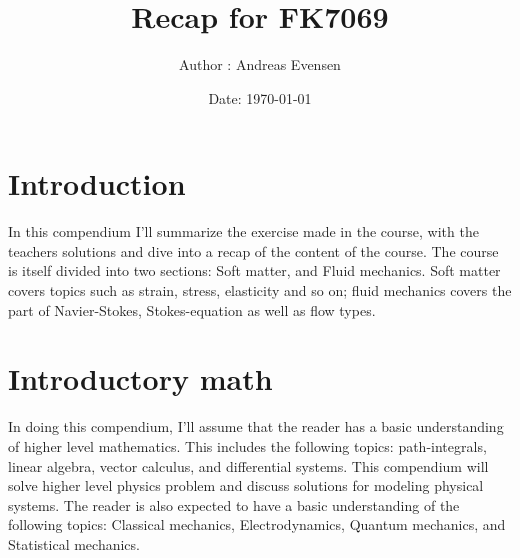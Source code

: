 \documentclass[a4paper]{article}
\title{Recap for FK7069}
\author{Author : Andreas Evensen}
\date{Date: \today}
\begin{document}
\maketitle
\tableofcontents
\section{Introduction}
In this compendium I'll summarize the exercise made in the course, with the teachers solutions and dive into a recap of the content of the course.
The course is itself divided into two sections: Soft matter, and Fluid mechanics. Soft matter covers topics such as strain, stress, elasticity and so on; fluid mechanics covers the part of Navier-Stokes, Stokes-equation as well as flow types.


\section{Introductory math}
In doing this compendium, I'll assume that the reader has a basic understanding of higher level mathematics. This includes the following topics: path-integrals, linear algebra, vector calculus, and differential systems.
This compendium will solve higher level physics problem and discuss solutions for modeling physical systems. The reader is also expected to have a basic understanding of the following topics: Classical mechanics, Electrodynamics, Quantum mechanics, and Statistical mechanics.
\end{document}
